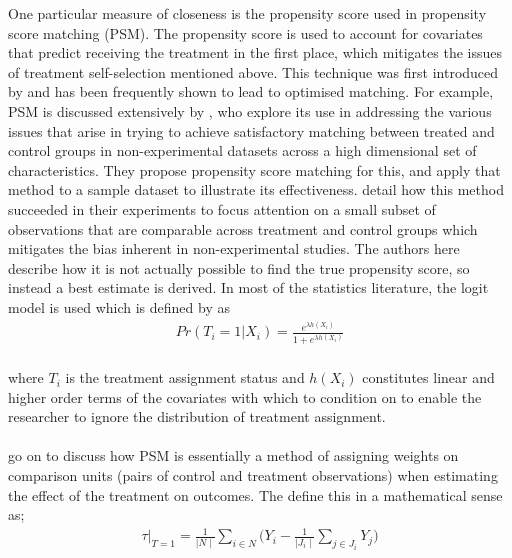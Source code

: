 {{One particular measure of closeness is the propensity score used in propensity score matching (PSM). The propensity score is used to account for covariates that predict receiving the treatment in the first place, which mitigates the issues of treatment self-selection mentioned above. This technique was first introduced by \cite{rosenbaumPSM} and has been frequently shown to lead to optimised matching. For example, PSM is discussed extensively by \cite{dehejiaPSM}, who explore its use in addressing the various issues that arise in trying to achieve satisfactory matching between treated and control groups in non-experimental datasets across a high dimensional set of characteristics. They propose propensity score matching for this, and apply that method to a sample dataset to illustrate its effectiveness. \cite{dehejiaPSM} detail how this method succeeded in their experiments to focus attention on a small subset of observations that are comparable across treatment and control groups which mitigates the bias inherent in non-experimental studies. The authors here describe how it is not actually possible to find the true propensity score, so instead a best estimate is derived. In most of the statistics literature, the logit model is used which is defined by \cite{dehejiaPSM} as \\
\begin {equation}\label{PSMLogit}
\begin{aligned}
Pr(T_i = 1 | X_i) = \frac{e^{\lambda h (X_i)}}{1 + e^{\lambda h (X_i)}}
\end{aligned}
\end{equation}\\
where $T_i$ is the treatment assignment status and $h(X_i)$ constitutes linear and higher order terms of the covariates with which to condition on to enable the researcher to ignore the distribution of treatment assignment.
\\\\
\cite{dehejiaPSM} go on to discuss how PSM is essentially a method of assigning weights on comparison units (pairs of control and treatment observations) when estimating the effect of the treatment on outcomes. The define this in a mathematical sense as;
\begin {equation}\label{PSMLogit}
\begin{aligned}
\tau | _{T=1} = \frac{1}{\mid{N}\mid} \sum_{i \in N} \Bigg( Y_i - \frac{1}{\mid{J_i}\mid} \sum_{j \in J_i} Y_j \Bigg) 
\end{aligned}
\end{equation}\\
}}
